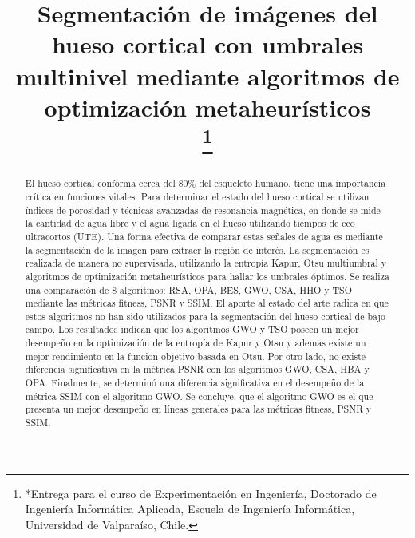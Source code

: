 \documentclass[conference]{IEEEtran}
\begin{document}
\title{Segmentación de imágenes del hueso cortical con umbrales multinivel mediante algoritmos de optimización metaheurísticos\\
\thanks{*Entrega para el curso de Experimentación en Ingeniería, Doctorado de Ingeniería Informática Aplicada, Escuela de Ingeniería Informática, Universidad de Valparaíso, Chile.}
}

\author{
\and
{}
}

\maketitle

\begin{abstract}
\noindent El hueso cortical conforma cerca del 80$\%$ del esqueleto humano, tiene una importancia crítica en funciones vitales. Para determinar el estado del hueso cortical se utilizan índices de porosidad y técnicas avanzadas de resonancia magnética, en donde se mide la cantidad de agua libre y el agua ligada en el hueso utilizando tiempos de eco ultracortos (UTE). Una forma efectiva de comparar estas señales de agua es mediante la segmentación de la imagen para extraer la región de interés. La segmentación es realizada de manera no supervisada, utilizando la entropía Kapur, Otsu multiumbral y algoritmos de optimización metaheurísticos para hallar los umbrales óptimos. Se realiza una comparación de 8 algoritmos: RSA, OPA, BES, GWO, CSA, HHO y TSO mediante las métricas fitness, PSNR y SSIM. El aporte al estado del arte radica en que estos algoritmos no han sido utilizados para la segmentación del hueso cortical de bajo campo. Los resultados indican que los algoritmos GWO y TSO poseen un mejor desempeño en la optimización de la entropía de Kapur y Otsu y ademas existe un mejor rendimiento en la funcion objetivo basada en Otsu. Por otro lado, no existe diferencia significativa en la métrica PSNR con los algoritmos GWO, CSA, HBA y OPA. Finalmente, se determinó una diferencia significativa en el desempeño de la métrica SSIM con el algoritmo GWO. Se concluye, que el algoritmo GWO es el que presenta un mejor desempeño en líneas generales para las métricas fitness, PSNR y SSIM.
\end{abstract}
\end{document}
